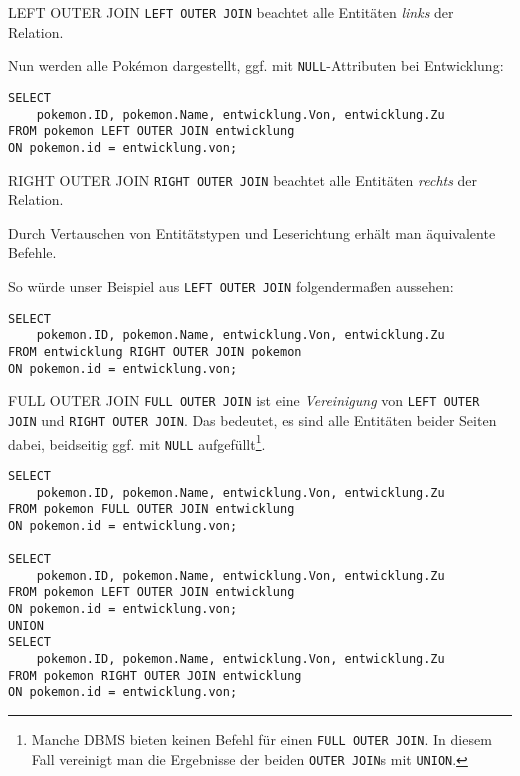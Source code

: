 \begin{sql}{LEFT OUTER JOIN}
    \texttt{LEFT OUTER JOIN} beachtet alle Entitäten \emph{links} der Relation.

    Nun werden alle Pokémon dargestellt, ggf. mit \texttt{NULL}-Attributen bei Entwicklung:

    \begin{verbatim}
SELECT
    pokemon.ID, pokemon.Name, entwicklung.Von, entwicklung.Zu
FROM pokemon LEFT OUTER JOIN entwicklung
ON pokemon.id = entwicklung.von;
    \end{verbatim}

    
\end{sql}

\begin{sql}{RIGHT OUTER JOIN}
    \texttt{RIGHT OUTER JOIN} beachtet alle Entitäten \emph{rechts} der Relation.

    Durch Vertauschen von Entitätstypen und Leserichtung erhält man äquivalente Befehle.

    So würde unser Beispiel aus \texttt{LEFT OUTER JOIN} folgendermaßen aussehen:

    \begin{verbatim}
SELECT
    pokemon.ID, pokemon.Name, entwicklung.Von, entwicklung.Zu
FROM entwicklung RIGHT OUTER JOIN pokemon
ON pokemon.id = entwicklung.von;
    \end{verbatim}
\end{sql}

\begin{sql}{FULL OUTER JOIN}
    \texttt{FULL OUTER JOIN} ist eine \emph{Vereinigung} von \texttt{LEFT OUTER JOIN} und \texttt{RIGHT OUTER JOIN}.
    Das bedeutet, es sind alle Entitäten beider Seiten dabei, beidseitig ggf. mit \texttt{NULL} aufgefüllt\footnote{
    Manche DBMS bieten keinen Befehl für einen \texttt{FULL OUTER JOIN}.
    In diesem Fall vereinigt man die Ergebnisse der beiden \texttt{OUTER JOIN}s mit \texttt{UNION}.}.

    \begin{verbatim}
SELECT
    pokemon.ID, pokemon.Name, entwicklung.Von, entwicklung.Zu
FROM pokemon FULL OUTER JOIN entwicklung
ON pokemon.id = entwicklung.von;

SELECT
    pokemon.ID, pokemon.Name, entwicklung.Von, entwicklung.Zu
FROM pokemon LEFT OUTER JOIN entwicklung
ON pokemon.id = entwicklung.von;
UNION
SELECT
    pokemon.ID, pokemon.Name, entwicklung.Von, entwicklung.Zu
FROM pokemon RIGHT OUTER JOIN entwicklung
ON pokemon.id = entwicklung.von;
    \end{verbatim}
\end{sql}

